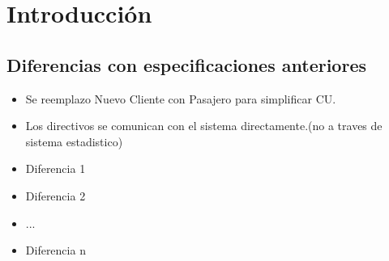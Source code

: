 \section{Introducción}

\subsection{Diferencias con especificaciones anteriores}
\begin{itemize}
	\item Se reemplazo Nuevo Cliente con Pasajero para simplificar CU.
	\item Los directivos se comunican con el sistema directamente.(no a traves de sistema estadistico)
	\item Diferencia 1
	\item Diferencia 2
	\item ...
	\item Diferencia n
\end{itemize}
